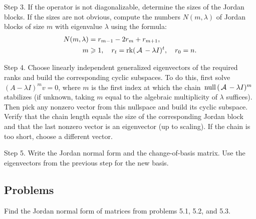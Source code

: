 Step 3. If the operator is not diagonalizable, determine the sizes of the Jordan blocks. If the sizes are not obvious, compute the numbers $N(m, \lambda)$ of Jordan blocks of size $m$ with eigenvalue $\lambda$ using the formula:
$$
\begin{aligned}
    N(m, \lambda) & = r_{m-1} - 2 r_m + r_{m+1}, \\
    m & \geqslant 1, \quad r_t = \operatorname{rk}(\,\mathcal{A}\, - \lambda I)^t, \quad r_0 = n.
    \end{aligned}
$$

Step 4. Choose linearly independent generalized eigenvectors of the required ranks and build the corresponding cyclic subspaces. To do this, first solve $(A - \lambda I)^m v = 0$, where $m$ is the first index at which the chain $\,\mathrm{null}\,(\,\mathcal{A}\, - \lambda I)^m$ stabilizes (if unknown, taking $m$ equal to the algebraic multiplicity of $\lambda$ suffices). Then pick any nonzero vector from this nullspace and build its cyclic subspace. Verify that the chain length equals the size of the corresponding Jordan block and that the last nonzero vector is an eigenvector (up to scaling). If the chain is too short, choose a different vector.

Step 5. Write the Jordan normal form and the change-of-basis matrix. Use the eigenvectors from the previous step for the new basis.

\subsection{Problems}

\begin{problem}
Find the Jordan normal form of matrices from problems 5.1, 5.2, and 5.3.
\end{problem}

